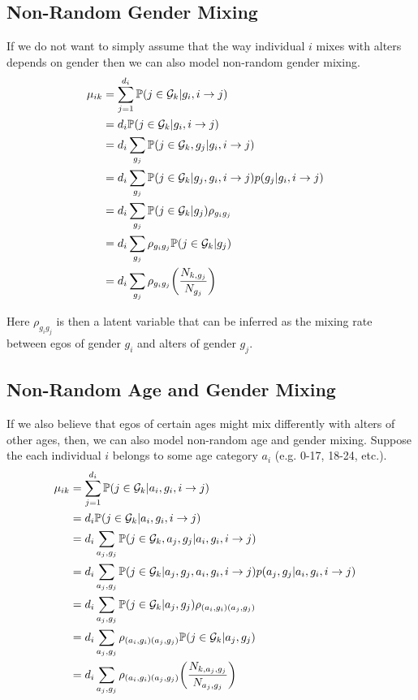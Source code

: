 \documentclass[12pt]{article}
\begin{document}
\subsection{Non-Random Gender Mixing}
If we do not want to simply assume that the way individual $i$ mixes with alters depends on gender then we can also model non-random gender mixing.
\begin{align}
\mu_{ik} 
&= \sum_{j=1}^{d_i} \mathbb{P}( j \in \mathcal{G}_k | g_i, i \to j ) && \\\nonumber
&= d_i \mathbb{P}( j \in \mathcal{G}_k | g_i, i \to j) && \\\nonumber
&= d_i \sum_{g_j} \mathbb{P}( j \in \mathcal{G}_k, g_j | g_i, i \to j) && \\\nonumber
&= d_i \sum_{g_j} \mathbb{P}( j \in \mathcal{G}_k | g_j, g_i, i \to j) p(g_j | g_i, i \to j) && \\\nonumber
&= d_i \sum_{g_j} \mathbb{P}( j \in \mathcal{G}_k | g_j) \rho_{g_ig_j} && \\\nonumber
&= d_i \sum_{g_j} \rho_{g_ig_j} \mathbb{P}( j \in \mathcal{G}_k | g_j)  && \\\nonumber
&= d_i \sum_{g_j} \rho_{g_ig_j} \biggl( \frac{N_{k,g_j}}{N_{g_j}} \biggr)
\end{align}

\noindent Here $\rho_{g_ig_j}$ is then a latent variable that can be inferred as the mixing rate between egos of gender $g_i$ and alters of gender $g_j$.

\subsection{Non-Random Age and Gender Mixing}
If we also believe that egos of certain ages might mix differently with alters of other ages, then, we can also model non-random age and gender mixing. Suppose the each individual $i$ belongs to some age category $a_i$ (e.g. 0-17, 18-24, etc.).
\begin{align}
\mu_{ik} 
&= \sum_{j=1}^{d_i} \mathbb{P}( j \in \mathcal{G}_k | a_i, g_i, i \to j ) && \\\nonumber
&= d_i \mathbb{P}( j \in \mathcal{G}_k | a_i, g_i, i \to j) && \\\nonumber
&= d_i \sum_{a_j,g_j} \mathbb{P}( j \in \mathcal{G}_k, a_j, g_j | a_i, g_i, i \to j) && \\\nonumber
&= d_i \sum_{a_j,g_j} \mathbb{P}( j \in \mathcal{G}_k | a_j, g_j, a_i, g_i, i \to j) p(a_j, g_j | a_i, g_i, i \to j) && \\\nonumber
&= d_i \sum_{a_j,g_j} \mathbb{P}( j \in \mathcal{G}_k | a_j, g_j) \rho_{(a_i,g_i)(a_j,g_j)} && \\\nonumber
&= d_i \sum_{a_j,g_j} \rho_{(a_i,g_i)(a_j,g_j)} \mathbb{P}( j \in \mathcal{G}_k | a_j, g_j)  && \\\nonumber
&= d_i \sum_{a_j,g_j} \rho_{(a_i,g_i)(a_j,g_j)} \biggl( \frac{N_{k,a_j,g_j}}{N_{a_j,g_j}} \biggr)
\end{align}
\end{document}
